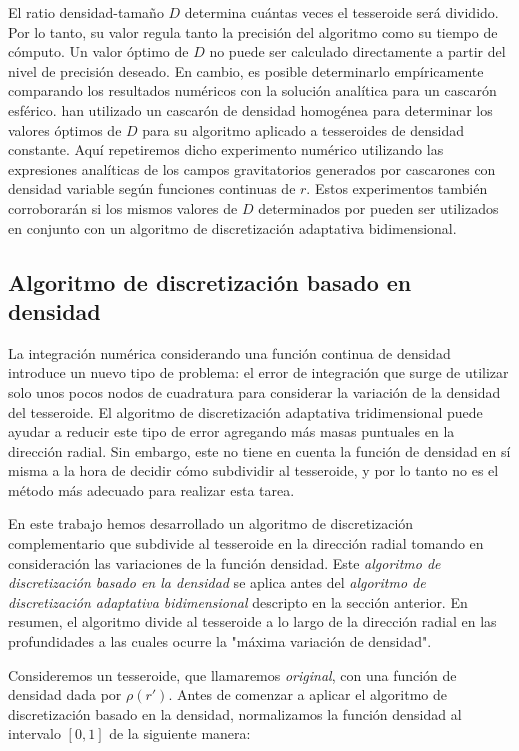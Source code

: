 El ratio densidad-tamaño $D$ determina cuántas veces el tesseroide será
dividido.
Por lo tanto, su valor regula tanto la precisión del algoritmo como su tiempo
de cómputo.
Un valor óptimo de $D$ no puede ser calculado directamente a partir del nivel
de precisión deseado.
En cambio, es posible determinarlo empíricamente comparando los resultados
numéricos con la solución analítica para un cascarón esférico.
\citet{uieda2016} han utilizado un cascarón de densidad homogénea para
determinar los valores óptimos de $D$ para su algoritmo aplicado a tesseroides
de densidad constante.
Aquí repetiremos dicho experimento numérico utilizando las expresiones
analíticas de los campos gravitatorios generados por cascarones con densidad
variable según funciones continuas de $r$.
Estos experimentos también corroborarán si los mismos valores de $D$
determinados por \citet{uieda2016} pueden ser utilizados en conjunto con un
algoritmo de discretización adaptativa bidimensional.


\subsection{Algoritmo de discretización basado en densidad}

La integración numérica considerando una función continua de densidad introduce
un nuevo tipo de problema: el error de integración que surge de utilizar solo
unos pocos nodos de cuadratura para considerar la variación de la densidad del
tesseroide.
El algoritmo de discretización adaptativa tridimensional puede ayudar a reducir
este tipo de error agregando más masas puntuales en la dirección radial.
Sin embargo, este no tiene en cuenta la función de densidad en sí misma a la
hora de decidir cómo subdividir al tesseroide, y por lo tanto no es el método
más adecuado para realizar esta tarea.

En este trabajo hemos desarrollado un algoritmo de discretización
complementario que subdivide al tesseroide en la dirección radial tomando en
consideración las variaciones de la función densidad.
Este \emph{algoritmo de discretización basado en la densidad} se aplica antes
del \emph{algoritmo de discretización adaptativa bidimensional} descripto en la
sección anterior.
En resumen, el algoritmo divide al tesseroide a lo largo de la dirección radial
en las profundidades a las cuales ocurre la "máxima variación de densidad".

Consideremos un tesseroide, que llamaremos \emph{original}, con una función de
densidad dada por $\rho(r')$.
Antes de comenzar a aplicar el algoritmo de discretización basado en la
densidad, normalizamos la función densidad al intervalo $[0, 1]$ de la
siguiente manera:

